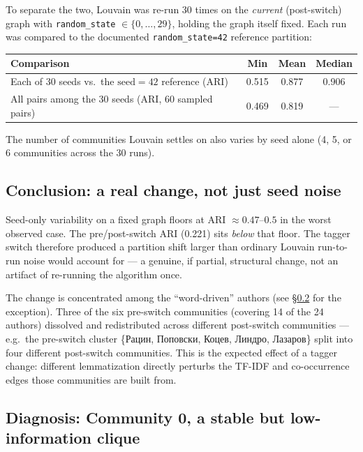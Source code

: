 \documentclass[11pt]{article}
\begin{document}
To separate the two, Louvain was re-run 30 times on the \emph{current}
(post-switch) graph with \texttt{random\_state} $\in \{0, \dots, 29\}$,
holding the graph itself fixed. Each run was compared to the documented
\texttt{random\_state=42} reference partition:

\begin{center}
\begin{tabular}{lccc}
\toprule
Comparison & Min & Mean & Median \\
\midrule
Each of 30 seeds vs.\ the $\text{seed}=42$ reference (ARI) & 0.515 & 0.877 & 0.906 \\
All pairs among the 30 seeds (ARI, 60 sampled pairs) & 0.469 & 0.819 & --- \\
\bottomrule
\end{tabular}
\end{center}

The number of communities Louvain settles on also varies by seed alone (4,
5, or 6 communities across the 30 runs).

\subsection{Conclusion: a real change, not just seed noise}

Seed-only variability on a fixed graph floors at ARI $\approx 0.47$--$0.5$ in
the worst observed case. The pre/post-switch ARI (0.221) sits
\emph{below} that floor. The tagger switch therefore produced a partition
shift larger than ordinary Louvain run-to-run noise would account for — a
genuine, if partial, structural change, not an artifact of re-running the
algorithm once.

The change is concentrated among the ``word-driven'' authors (see
\S\ref{sec:community0} for the exception). Three of the six pre-switch
communities (covering 14 of the 24 authors) dissolved and redistributed
across different post-switch communities — e.g.\ the pre-switch cluster
\{Рацин, Поповски, Коцев, Линдро, Лазаров\} split into four different
post-switch communities. This is the expected effect of a tagger change:
different lemmatization directly perturbs the TF-IDF and co-occurrence edges
those communities are built from.

\subsection{Diagnosis: Community 0, a stable but low-information clique}
\label{sec:community0}
\end{document}

